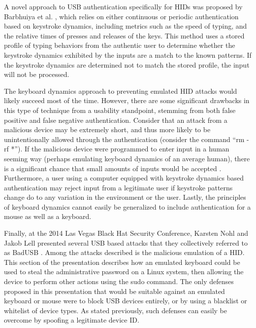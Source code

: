 \documentclass[pagenumbers]{ieee}
\begin{document}
A novel approach to USB authentication specifically for HIDs was proposed by Barbhuiya et al. \cite{barbhuiya}, which relies on either continuous or periodic authentication based on keystroke dynamics, including metrics such as the speed of typing, and the relative times of presses and releases of the keys. This method uses a stored profile of typing behaviors from the authentic user to determine whether the keystroke dynamics exhibited by the inputs are a match to the known patterns. If the keystroke dynamics are determined not to match the stored profile, the input will not be processed.

The keyboard dynamics approach to preventing emulated HID attacks would likely succeed most of the time. However, there are some significant drawbacks in this type of technique from a usability standpoint, stemming from both false positive and false negative authentication. Consider that an attack from a malicious device may be extremely short, and thus more likely to be unintentionally allowed through the authentication (consider the command ``rm -rf *''). If the malicious device were programmed to enter input in a human seeming way (perhaps emulating keyboard dynamics of an average human), there is a significant chance that small amounts of inputs would be accepted \cite{shahzad}. Furthermore, a user using a computer equipped with keystroke dynamics based authentication may reject input from a legitimate user if keystroke patterns change do to any variation in the environment or the user. Lastly, the principles of keyboard dynamics cannot easily be generalized to include authentication for a mouse as well as a keyboard.

Finally, at the 2014 Las Vegas Black Hat Security Conference, Karsten Nohl and Jakob Lell presented several USB based attacks that they collectively referred to as BadUSB \cite{nohl}. Among the attacks described is the malicious emulation of a HID. This section of the presentation describes how an emulated keyboard could be used to steal the administrative password on a Linux system, then allowing the device to perform other actions using the sudo command. The only defenses proposed in this presentation that would be suitable against an emulated keyboard or mouse were to block USB devices entirely, or by using a blacklist or whitelist of device types. As stated previously, such defenses can easily be overcome by spoofing a legitimate device ID.

\end{document}
